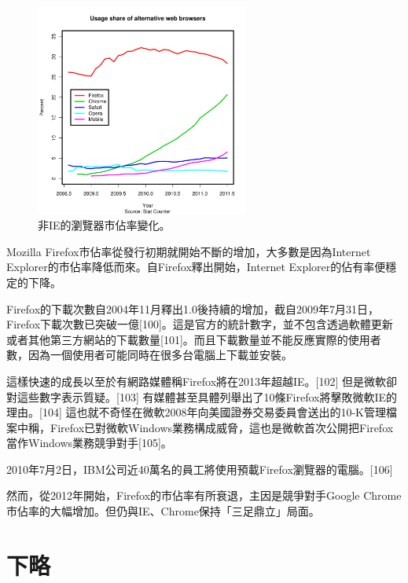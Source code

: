 \documentclass[12pt, a4paper, twoside]{article}
\begin{document}
\begin{figure}
  \begin{center}
    \includegraphics[width=70mm]{Usage}
  \end{center}
  \caption{非IE的瀏覽器市佔率變化。}
\end{figure}

Mozilla Firefox市佔率從發行初期就開始不斷的增加，大多數是因為Internet Explorer的市佔率降低而來。自Firefox釋出開始，Internet Explorer的佔有率便穩定的下降。

Firefox的下載次數自2004年11月釋出1.0後持續的增加，截自2009年7月31日，Firefox下載次數已突破一億[100]。這是官方的統計數字，並不包含透過軟體更新或者其他第三方網站的下載數量[101]。而且下載數量並不能反應實際的使用者數，因為一個使用者可能同時在很多台電腦上下載並安裝。

這樣快速的成長以至於有網路媒體稱Firefox將在2013年超越IE。[102] 但是微軟卻對這些數字表示質疑。[103] 有媒體甚至具體列舉出了10條Firefox將擊敗微軟IE的理由。[104] 這也就不奇怪在微軟2008年向美國證券交易委員會送出的10-K管理檔案中稱，Firefox已對微軟Windows業務構成威脅，這也是微軟首次公開把Firefox當作Windows業務競爭對手[105]。

2010年7月2日，IBM公司近40萬名的員工將使用預載Firefox瀏覽器的電腦。[106]

然而，從2012年開始，Firefox的市佔率有所衰退，主因是競爭對手Google Chrome市佔率的大幅增加。但仍與IE、Chrome保持「三足鼎立」局面。

\section{下略}
\end{document}
